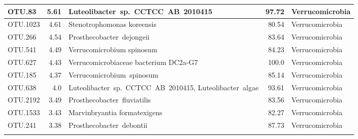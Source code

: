 \begin{longtable}{lrp{6.5cm}rl}
OTU.83 & 5.61 & \mbox{Luteolibacter sp. CCTCC AB 2010415} & 97.72 & Verrucomicrobia \\ \midrule
OTU.1023 & 4.61 & Stenotrophomonas koreensis & 80.54 & Verrucomicrobia \\ \midrule
OTU.266 & 4.54 & \mbox{Prosthecobacter dejongeii} & 83.64 & Verrucomicrobia \\ \midrule
OTU.541 & 4.49 & Verrucomicrobium spinosum & 84.23 & Verrucomicrobia \\ \midrule
OTU.627 & 4.43 & Verrucomicrobiaceae bacterium DC2a-G7 & 100.0 & Verrucomicrobia \\ \midrule
OTU.185 & 4.37 & \mbox{Verrucomicrobium spinosum} & 85.14 & Verrucomicrobia \\ \midrule
OTU.638 & 4.0 & \mbox{Luteolibacter sp. CCTCC AB 2010415}, \mbox{Luteolibacter algae} & 93.61 & Verrucomicrobia \\ \midrule
OTU.2192 & 3.49 & \mbox{Prosthecobacter fluviatilis} & 83.56 & Verrucomicrobia \\ \midrule
OTU.1533 & 3.43 & Marvinbryantia formatexigens & 82.27 & Verrucomicrobia \\ \midrule
OTU.241 & 3.38 & \mbox{Prosthecobacter debontii} & 87.73 & Verrucomicrobia \\ \midrule

    \bottomrule
\label{tab:cell}
\end{longtable}
